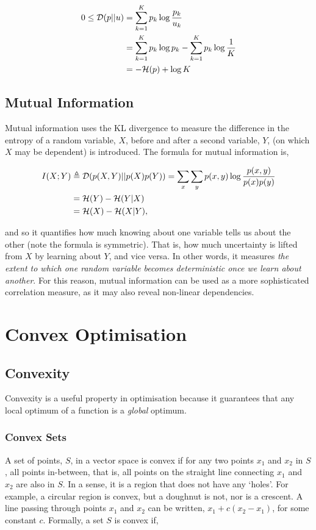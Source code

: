 \documentclass[11pt]{amsart}
\begin{document}
\begin{align}
0 \leq \mathcal{D}(p || u) &= \sum_{k=1}^K p_k \log\frac{p_k}{u_k} \notag \\
&= \sum_{k=1}^K p_k \log{p_k} - \sum_{k=1}^K p_k \log \frac{1}{K} \notag \\
&= -\mathcal{H}(p) + \log K \notag
\end{align}

\subsection{Mutual Information}

Mutual information uses the KL divergence to measure the difference in the entropy of a random variable, $X$, before and after a second variable, $Y$, (on which $X$ may be dependent) is introduced. The formula for mutual information is,

\begin{align}
I(X; Y) &\triangleq \mathcal{D}(p(X, Y) || p(X)p(Y)) = \sum_x \sum_y p(x, y) \log\frac{p(x, y)}{p(x)p(y)}\notag \\
&= \mathcal{H}(Y) - \mathcal{H}(Y|X) \notag \\
&= \mathcal{H}(X) - \mathcal{H}(X|Y) \notag,
\end{align}

and so it quantifies how much knowing about one variable tells us about the other (note the formula is symmetric). That is, how much uncertainty is lifted from $X$ by learning about $Y$, and vice versa. In other words, it measures \emph{the extent to which one random variable becomes deterministic once we learn about another}. For this reason, mutual information can be used as a more sophisticated correlation measure, as it may also reveal non-linear dependencies.

\section{Convex Optimisation}
\subsection{Convexity}
Convexity is a useful property in optimisation because it guarantees that any local optimum of a function is a \emph{global} optimum.

\subsubsection{Convex Sets}
A set of points, $S$, in a vector space is convex if for any two points $x_1$ and $x_2$ in $S$, all points in-between, that is, all points on the straight line connecting $x_1$ and $x_2$ are also in $S$. In a sense, it is a region that does not have any `holes'. For example, a circular region is convex, but a doughnut is not, nor is a crescent. A line passing through points $x_1$ and $x_2$ can be written, $x_1 + c(x_2 - x_1)$, for some constant $c$. Formally, a set $S$ is convex if,
\end{document}
